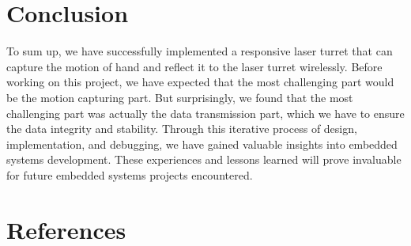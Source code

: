 \documentclass[12pt, a4paper]{article}
\begin{document}
\section{Conclusion}
To sum up, we have successfully implemented a responsive laser turret that can capture the motion of hand and reflect it to the laser turret wirelessly.
\newline
Before working on this project, we have expected that the most challenging part would be the motion capturing part. 
But surprisingly, we found that the most challenging part was actually the data transmission part, which we have to ensure the data integrity and stability.
Through this iterative process of design, implementation, and debugging, we have gained valuable insights into embedded systems development. 
These experiences and lessons learned will prove invaluable for future embedded systems projects encountered.

\section{References}
\printbibliography[heading=none]
\end{document}
